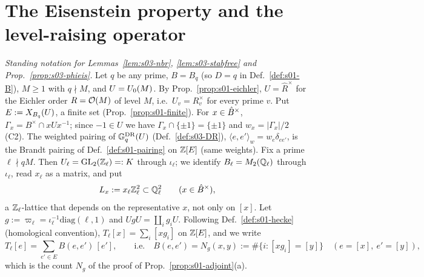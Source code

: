 \section{The Eisenstein property and the level-raising operator}\label{ss:s03-eisenstein}

\emph{Standing notation for Lemmas~\ref{lem:s03-nbr}, \ref{lem:s03-stabfree} and Prop.~\ref{prop:s03-phieis}.} Let $q$ be any prime,
$B=B_q$ (so $D=q$ in Def.~\ref{def:s01-B}), $M\ge1$ with $q\nmid M$, and $U=U_0(M)$. By Prop.~\ref{prop:s01-eichler}, $U=\hat R^\times$ for the
Eichler order $R=\mathcal{O}(M)$ of level $M$, i.e.\ $U_v=R_v^\times$ for every prime $v$. Put $E:=X_{B_q}(U)$, a finite set (Prop.~\ref{prop:s01-finite}).
For $x\in\hat{B}^\times$, $\Gamma_x=B^\times\cap xUx^{-1}$; since $-1\in U$ we have $\Gamma_x\cap\{\pm1\}=\{\pm1\}$ and $w_x=|\Gamma_x|/2$ (C2). The
weighted pairing of $\mathbb{G}^{\mathrm{DR}}_q(U)$ (Def.~\ref{def:s03-DR}), $\langle e,e'\rangle_w=w_e\delta_{ee'}$, is the Brandt pairing of
Def.~\ref{def:s01-pairing} on $\mathbb{Z}[E]$ (same weights). Fix a prime $\ell\nmid qM$. Then $U_\ell=\mathrm{GL}_2(\mathbb{Z}_\ell)=:K$ through $\iota_\ell$; we identify
$B_\ell=M_2(\mathbb{Q}_\ell)$ through $\iota_\ell$, read $x_\ell$ as a matrix, and put
\[L_x:=x_\ell\mathbb{Z}_\ell^2\subset\mathbb{Q}_\ell^2\qquad(x\in\hat{B}^\times),\]
a $\mathbb{Z}_\ell$-lattice that depends on the representative $x$, not only on $[x]$. Let $g:=\varpi_\ell=\iota_\ell^{-1}\mathrm{diag}(\ell,1)$ and
$UgU=\coprod_{i}g_iU$. Following Def.~\ref{def:s01-hecke} (homological convention), $T_\ell[x]=\sum_i[xg_i]$ on $\mathbb{Z}[E]$, and we write
\[T_\ell[e]=\sum_{e'\in E}B(e,e')\,[e'],\qquad\text{i.e.}\quad B(e,e')=N_g(x,y):=\#\{i:[xg_i]=[y]\}\quad(e=[x],\ e'=[y]),\]
which is the count $N_g$ of the proof of Prop.~\ref{prop:s01-adjoint}(a).

